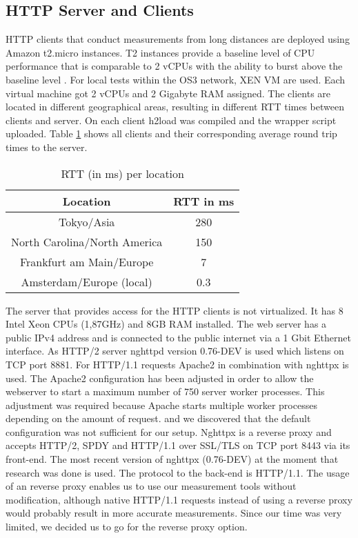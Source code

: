 \subsection{HTTP Server and Clients}
\label{subsec:server_client}
HTTP clients that conduct measurements from long distances are deployed using Amazon t2.micro instances. T2 instances provide a baseline level of CPU performance that is comparable to 2 vCPUs with the ability to burst above the baseline level \cite{amazon-ts}. For local tests within the OS3 network, XEN VM are used. Each virtual machine got 2 vCPUs and 2 Gigabyte RAM assigned. The clients are located in different geographical areas, resulting in different RTT times between clients and server. On each client h2load was compiled and the wrapper script uploaded. Table \ref{table:locations} shows all clients and their corresponding average round trip times to the server.

\begin{table}[h]
	\centering
\begin{tabular}{ | c | c | }

\hline
\textbf{Location} & \textbf{RTT in ms}\\ \hline \hline
Tokyo/Asia &  280\\ \hline
North Carolina/North America &  150\\ \hline 
Frankfurt am Main/Europe &  7\\ \hline
Amsterdam/Europe (local) &  0.3\\

\hline
\end{tabular}
\caption{RTT (in ms) per location}
\label{table:locations}
\end{table}

The server that provides access for the HTTP clients is not virtualized. It has 8 Intel Xeon CPUs (1,87GHz) and 8GB RAM installed. The web server has a public IPv4 address and is connected to the public internet via a 1 Gbit Ethernet interface. As HTTP/2 server nghttpd \cite{nghttp} version 0.76-DEV is used which listens on TCP port 8881. For HTTP/1.1 requests Apache2 \cite{apache2} in combination with nghttpx \cite{nghttpx} is used. The Apache2 configuration has been adjusted in order to allow the webserver to start a maximum number of 750 server worker processes. This adjustment was required because Apache starts multiple worker processes depending on the amount of request. and we discovered that the default configuration was not sufficient for our setup. Nghttpx is a reverse proxy and accepts HTTP/2, SPDY and HTTP/1.1 over SSL/TLS on TCP port 8443 via its front-end. The most recent version of nghttpx (0.76-DEV) at the moment that research was done is used. The protocol to the back-end is HTTP/1.1. The usage of an reverse proxy enables us to use our measurement tools without modification, although native HTTP/1.1 requests instead of using a reverse proxy would probably result in more accurate measurements. Since our time was very limited, we decided us to go for the reverse proxy option.

